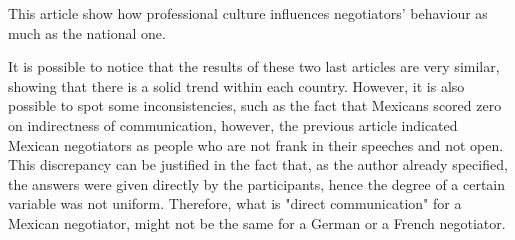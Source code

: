 \documentclass[../main.tex]{subfiles}
\begin{document}
This article show how professional culture influences negotiators' behaviour as much as the national one.

It is possible to notice that the results of these two last articles are very similar, showing that there is a solid trend within each country. However, it is also possible to spot some inconsistencies, such as the fact that Mexicans scored zero on indirectness of communication, however, the previous article indicated Mexican negotiators as people who are not frank in their speeches and not open. This discrepancy can be justified in the fact that, as the author already specified, the answers were given directly by the participants, hence the degree of a certain variable was not uniform. Therefore, what is "direct communication" for a Mexican negotiator, might not be the same for a German or a French negotiator.

\vspace{0.3cm}
\begin{minipage}{\linewidth}
\end{minipage}
\vspace{0.3cm}
\end{document}
